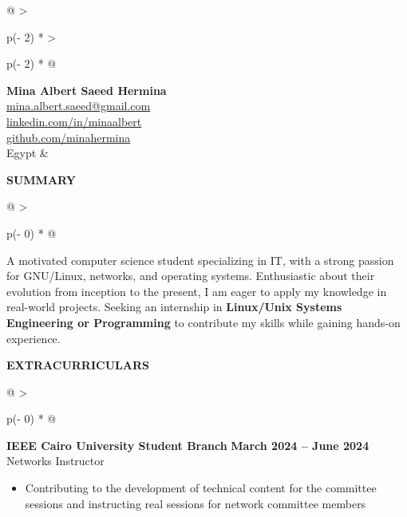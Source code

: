 \documentclass[a4paper]{article}
\begin{document}
\begin{longtable}[]{@{}
  >{\raggedright\arraybackslash}p{(\columnwidth - 2\tabcolsep) * }
  >{\raggedright\arraybackslash}p{(\columnwidth - 2\tabcolsep) * }@{}}
\textbf{\LARGE{Mina Albert Saeed Hermina}}
\vspace{1pt} \\ 
\href{mailto:mina.albert.saeed@gmail.com}{mina.albert.saeed@gmail.com} \\

\href{https://www.linkedin.com/in/minaalbert}{linkedin.com/in/minaalbert} \\

\href{https://github.com/minahermina}{github.com/minahermina} \\
Egypt & \\
\end{longtable}
\vspace{-10pt}

\textbf{SUMMARY}
\vspace{-8pt}
\nopagebreak[4]
\begin{longtable}[]{@{}
  >{\raggedright\arraybackslash}p{(\columnwidth - 0\tabcolsep) * }@{}}
\toprule
\addlinespace[7pt] %
A motivated computer science student specializing in IT, with a strong passion for GNU/Linux, networks, and operating systems. Enthusiastic about their evolution from inception to the present, I am eager to apply my knowledge in real-world projects. Seeking an internship in \textbf{Linux/Unix Systems Engineering or Programming} to contribute my skills while gaining hands-on experience.
\end{longtable}
\vspace{-8pt}

\textbf{EXTRACURRICULARS}
\vspace{-7pt}
\nopagebreak[4]
\begin{longtable}[]{@{}
  >{\raggedright\arraybackslash}p{(\columnwidth - 0\tabcolsep) * }@{} }
\toprule\noalign{}
\vspace{-7pt}
    \begin{minipage}[t]{\linewidth}\raggedright
        \textbf{IEEE Cairo University Student Branch}
        \hspace{27.6em}\textbf{March 2024 -- June 2024} \\
        Networks Instructor
        \vspace{.05em}
        \begin{itemize}
            \item
              Contributing to the development of technical content for the committee
sessions and instructing real sessions for network committee members
\end{itemize} \end{minipage} 
\end{longtable}
\vspace{-10pt}
\end{document}
